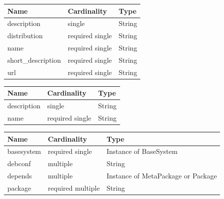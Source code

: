 {\begin{table}[!h]
   \begin{center}
         \label{tab:main_class_base}
	\begin{tabular}{p{3cm}p{3cm}p{4cm}}
	\textbf{Name}  & \textbf{Cardinality}  & \textbf{Type}\\
	\hline
	description    & single                & String       \\
	distribution   & required single       & String       \\
	name           & required single       & String       \\
	short\_description & required single   & String       \\
	url            & required single       & String       \\
	\end{tabular} 
   \end{center}
\end{table}


\begin{table}[!h]
   \begin{center}
         \label{tab:main_class_tag}
	\begin{tabular}{p{3cm}p{3cm}p{4cm}}
	\textbf{Name}  & \textbf{Cardinality}  & \textbf{Type}\\
	\hline
	description    & single                & String       \\
	name           & required single       & String       \\
	\end{tabular} 
   \end{center}
\end{table}

\begin{table}[!h]
   \begin{center}
         \label{tab:main_class_debian}
	\begin{tabular}{p{3cm}p{3cm}p{6cm}}
	\textbf{Name}  & \textbf{Cardinality}  & \textbf{Type}\\
	\hline
	basesystem     & required single       & Instance of BaseSystem       \\
	debconf        & multiple              & String       \\
	depends        & multiple              & Instance of MetaPackage  or Package      \\
	package        & required multiple     & String      \\
	\end{tabular} 
   \end{center}
\end{table}

}

